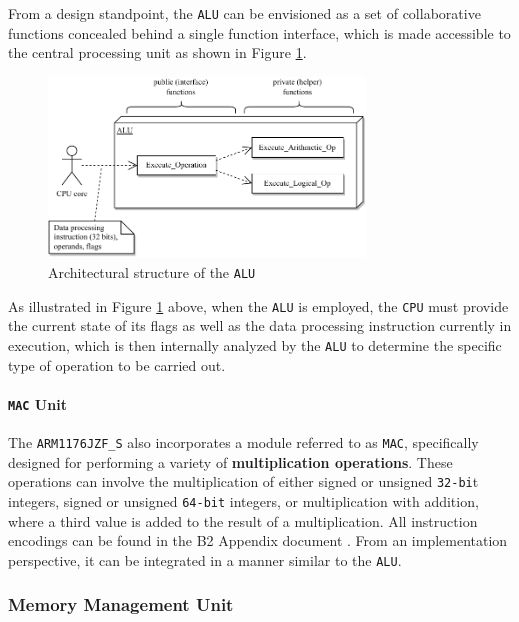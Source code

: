 \documentclass[english, ing, kiv, he, iso690numb, pdf]{fasthesis}
\begin{document}
	From a design standpoint, the \texttt{ALU} can be envisioned as a set of collaborative functions concealed behind a single function interface, which is made accessible to the central processing unit as shown in Figure \ref{Architectural structure of the ALU}.
	
	\begin{figure}[ht]
		\centering
		\includegraphics[width=0.75\textwidth]{img/diagrams/alu.pdf}
		\caption{Architectural structure of the \texttt{ALU}}
		\label{Architectural structure of the ALU}
	\end{figure}
	
	As illustrated in Figure \ref{Architectural structure of the ALU} above, when the \texttt{ALU} is employed, the \texttt{CPU} must provide the current state of its flags as well as the data processing instruction currently in execution, which is then internally analyzed by the \texttt{ALU} to determine the specific type of operation to be carried out.
	
	\paragraph{\texttt{MAC} Unit}
	
	The \texttt{ARM1176JZF\_S} also incorporates a module referred to as \texttt{MAC}, specifically designed for performing a variety of \textbf{multiplication operations}. These operations can involve the multiplication of either signed or unsigned \texttt{32-bi}t integers, signed or unsigned \texttt{64-bit} integers, or multiplication with addition, where a third value is added to the result of a multiplication. All instruction encodings can be found in the B2 Appendix document \cite{B2_appendix}. From an implementation perspective, it can be integrated in a manner similar to the \texttt{ALU}.
	
	\subsubsection{Memory Management Unit}
	
\end{document}
